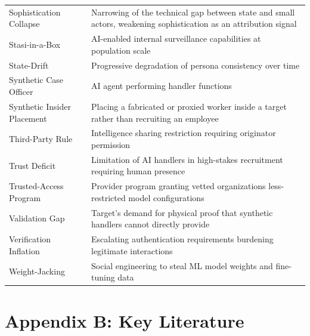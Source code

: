 \documentclass[11pt,letterpaper]{article}
\begin{document}
{\begin{longtable}{L{4.8cm}L{11.4cm}}
Sophistication Collapse & Narrowing of the technical gap between state and small actors, weakening sophistication as an attribution signal \\
Stasi-in-a-Box & AI-enabled internal surveillance capabilities at population scale \\
State-Drift & Progressive degradation of persona consistency over time \\
Synthetic Case Officer & AI agent performing handler functions \\
Synthetic Insider Placement & Placing a fabricated or proxied worker inside a target rather than recruiting an employee \\
Third-Party Rule & Intelligence sharing restriction requiring originator permission \\
Trust Deficit & Limitation of AI handlers in high-stakes recruitment requiring human presence \\
Trusted-Access Program & Provider program granting vetted organizations less-restricted model configurations \\
Validation Gap & Target's demand for physical proof that synthetic handlers cannot directly provide \\
Verification Inflation & Escalating authentication requirements burdening legitimate interactions \\*
Weight-Jacking & Social engineering to steal ML model weights and fine-tuning data \\
\bottomrule
\end{longtable}}

\section*{Appendix B: Key Literature}
\end{document}
